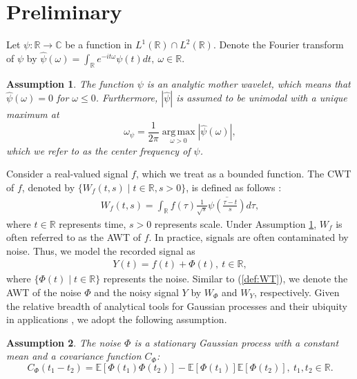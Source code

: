 \documentclass{amsart}
\newtheorem{Assumption}{Assumption}
\begin{document}
\section{Preliminary}\label{sec:preliminary}


Let $\psi: \mathbb{R}\rightarrow  \mathbb{C}$ be a function in $L^{1}(\mathbb{R})\cap L^{2}(\mathbb{R})$.
Denote the Fourier transform of $\psi$ by
$\widehat{\psi}(\omega) = \int_{\mathbb{R}}e^{-i t\omega}\psi(t)dt,\ \omega\in \mathbb{R}$.
\begin{Assumption}\label{assump:analytic}
The function $\psi$ is an analytic mother wavelet, which means that
$\widehat{\psi}(\omega)=0$ for $\omega\leq0$.
Furthermore, $|\widehat{\psi}|$ is assumed to be unimodal with a unique maximum at
\[
\omega_{\psi}=\frac{1}{2\pi}\operatorname*{arg\,max}_{\omega>0}|\widehat{\psi}(\omega)|,
\]
which we refer to as the center frequency of $\psi$.
\end{Assumption}
Consider a real-valued signal $f$, which we treat as a bounded function.
The CWT of $f$, denoted by $\{W_{f}(t,s)\mid t\in \mathbb{R}, s>0\}$, is defined as follows \cite{daubechies1992ten}:
\begin{align}\label{def:WT}
W_{f}(t,s)
=\int_{\mathbb{R}} f(\tau) \frac{1}{\sqrt{s}}\overline{\psi\left(\frac{\tau-t}{s}\right)} d\tau,
\end{align}
where $t\in \mathbb{R}$ represents time, $s>0$ represents scale.
Under Assumption \ref{assump:analytic}, $W_{f}$ is often referred to as the AWT of $f$.
In practice, signals are often contaminated by noise. Thus, we model the recorded signal as
\begin{align*}%
Y(t) = f(t)+\Phi(t),\ t\in \mathbb{R},
\end{align*}
where $\{\Phi(t)\mid t\in \mathbb{R}\}$ represents the noise.
Similar to (\ref{def:WT}), we denote the AWT of the noise $\Phi$ and the noisy signal $Y$ by $W_{\Phi}$ and $W_{Y}$,
respectively.
Given the relative breadth of analytical tools for Gaussian processes \cite{breuer1983central,clausel2012large, dobrushin1979non,ivanov2013limit,taqqu1979convergence} and their ubiquity in applications \cite{makowiec2006long}, we adopt the following assumption.
\begin{Assumption}\label{assump:Gaussian}
The noise $\Phi$ is a stationary Gaussian process with a constant mean and
a covariance function $C_{\Phi}$:
\begin{equation*}
C_{\Phi}(t_{1}-t_{2}) = \mathbb{E}[\Phi(t_{1})\Phi(t_{2})]- \mathbb{E}[\Phi(t_{1})] \mathbb{E}[\Phi(t_{2})],\ t_{1},t_{2}\in \mathbb{R}.
\end{equation*}
\end{Assumption}
\end{document}
